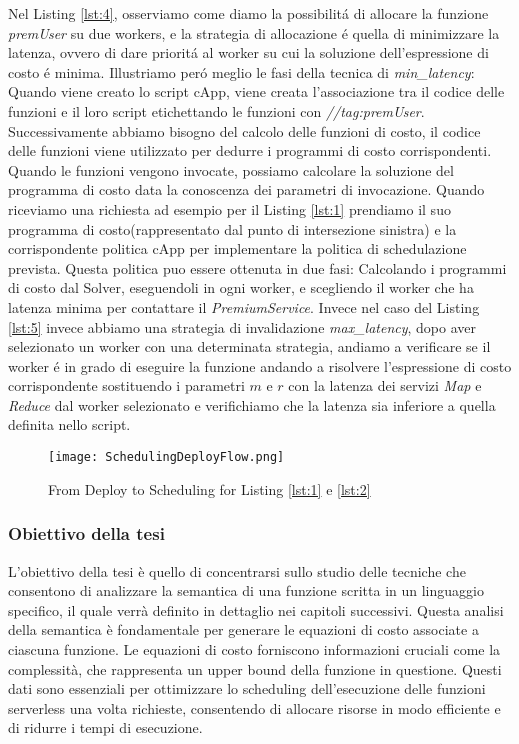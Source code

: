 \documentclass[../../main.tex]{subfiles}
\begin{document}
Nel Listing \ref{lst:4}, osserviamo come diamo la possibilitá di allocare la funzione \textit{premUser} su due workers, e la strategia di allocazione é quella di minimizzare la latenza, ovvero di dare prioritá al worker su cui la soluzione dell'espressione di costo é minima.
Illustriamo peró meglio le fasi della tecnica di \textit{min\_latency}:
Quando viene creato lo script cApp, viene creata l'associazione tra il codice delle funzioni e il loro script etichettando le funzioni con \textit{//tag:premUser}.
Successivamente abbiamo bisogno del calcolo delle funzioni di costo, il codice delle funzioni viene utilizzato per dedurre i programmi di costo corrispondenti.
Quando le funzioni vengono invocate, possiamo calcolare la soluzione del programma di costo data la conoscenza dei parametri di invocazione.
Quando riceviamo una richiesta ad esempio per il Listing \ref{lst:1} prendiamo il suo programma di costo(rappresentato dal punto di intersezione sinistra) e la corrispondente politica cApp per implementare la politica di schedulazione prevista.
Questa politica puo essere ottenuta in due fasi: Calcolando i programmi di costo dal Solver, eseguendoli in ogni worker, e scegliendo il worker che ha latenza minima per contattare il \textit{PremiumService}.
Invece nel caso del Listing \ref{lst:5} invece abbiamo una strategia di invalidazione \textit{max\_latency}, dopo aver selezionato un worker con una determinata strategia, andiamo a verificare se il worker é in grado di eseguire la funzione andando a risolvere l'espressione di costo corrispondente sostituendo i parametri $m$ e $r$ con la latenza dei servizi \textit{Map} e \textit{Reduce} dal worker selezionato e verifichiamo che la latenza sia inferiore a quella definita nello script.\autocite{deserverless}\\
\begin{figure}[H]
    \texttt{[image: SchedulingDeployFlow.png]}
    \centering
    \caption{From Deploy to Scheduling for Listing \ref{lst:1} e \ref{lst:2} }
\end{figure}
\newpage
\subsubsection{Obiettivo della tesi}
L'obiettivo della tesi è quello di concentrarsi sullo studio delle tecniche che consentono di analizzare la semantica di una funzione scritta in un linguaggio specifico, il quale verrà definito in dettaglio nei capitoli successivi. Questa analisi della semantica è fondamentale per generare le equazioni di costo associate a ciascuna funzione. Le equazioni di costo forniscono informazioni cruciali come la complessità, che rappresenta un upper bound della funzione in questione. Questi dati sono essenziali per ottimizzare lo scheduling dell'esecuzione delle funzioni serverless una volta richieste, consentendo di allocare risorse in modo efficiente e di ridurre i tempi di esecuzione.
\end{document}
